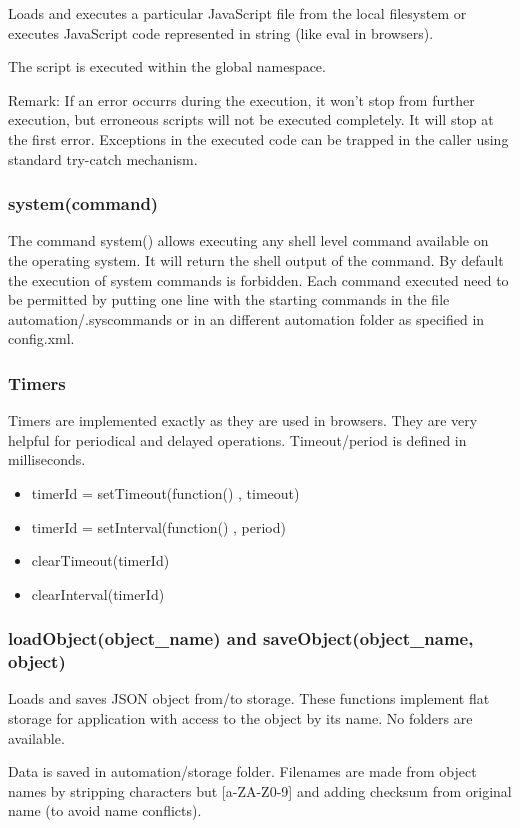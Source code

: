 Loads and executes a particular JavaScript file from the local filesystem or executes 
JavaScript code represented in string (like eval in browsers).

The script is executed within the global namespace.

Remark: If an error occurrs during the execution, it won't stop from further execution, 
but erroneous scripts will not be executed completely. It will stop at the first error.
Exceptions in the executed code can be trapped in the caller using standard try-catch mechanism.

\subsubsection{system(command)}

The command system() allows executing any shell level command available on the operating 
system. It will return the shell output of the command.  By default the execution of 
system commands is forbidden. Each command executed need to be permitted by putting one 
line with the starting commands in the file automation/.syscommands or in an different 
automation folder as specified in config.xml.

\subsubsection{Timers}
Timers are implemented exactly as they are used in browsers. They are very helpful for 
periodical and delayed operations. Timeout/period is defined in milliseconds.
\begin{itemize}
\item timerId = setTimeout(function() { }, timeout)
\item timerId = setInterval(function() { }, period)
\item clearTimeout(timerId)
\item clearInterval(timerId)
\end{itemize}

\subsubsection{loadObject(object\_name) and saveObject(object\_name, object)}
Loads and saves JSON object from/to storage. These functions implement flat storage for 
application with access to the object by its name. No folders are available.

Data is saved in automation/storage folder. Filenames are made from object names by 
stripping characters but [a-ZA-Z0-9] and adding checksum from original name (to avoid name conflicts).

